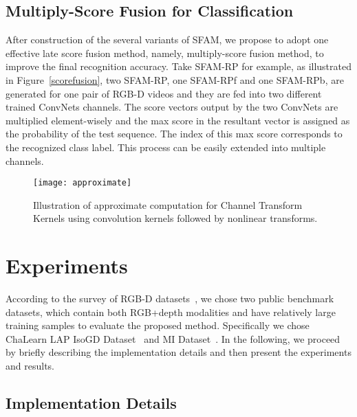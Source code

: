 \documentclass[10pt,twocolumn,letterpaper]{article}
\begin{document}
\subsection{Multiply-Score Fusion for Classification}
After construction of the several variants of SFAM, we propose to adopt one 
effective late score fusion method, namely, multiply-score fusion method, to 
improve the final recognition accuracy. 
Take SFAM-RP for example,  as illustrated in Figure~\ref{scorefusion}, two 
SFAM-RP, one SFAM-RPf and one SFAM-RPb, are generated for one pair of RGB-D videos 
and they are fed into two different trained ConvNets channels. The score 
vectors output by the two ConvNets are multiplied element-wisely  and 
the max score in the resultant vector is assigned as the probability of the 
test sequence. The index of this max score corresponds to the recognized class 
label. This process can be easily extended into multiple channels.

\begin{figure}[t]
\begin{center}
{\texttt{[image: approximate]}}
\end{center}
\caption{Illustration of approximate computation for Channel Transform Kernels 
using convolution kernels followed by nonlinear transforms. }
\label{approximate}
\end{figure}

\section{Experiments}\label{results}

According to the survey of RGB-D datasets~\cite{zhang2016rgb}, we chose two 
public benchmark datasets, which contain both RGB+depth modalities and have 
relatively large training samples to evaluate the proposed method. Specifically 
we chose ChaLearn LAP IsoGD Dataset~\cite{wanchalearn} and 
MI Dataset~\cite{liu2016benchmarking}. In the following, we 
proceed by briefly describing the implementation details and then present 
the experiments and results.

\subsection{Implementation Details}
\end{document}

